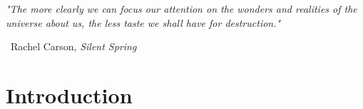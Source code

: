 \documentclass[11pt,a4paper]{report}
\begin{document}


\clearpage
\tableofcontents                     
\listoftables                     
\listoffigures                    
\begin{thesisacknowledgments}        
       
\end{thesisacknowledgments}

\begin{thesisdeclaration}       
 
\end{thesisdeclaration}

\begin{thesisabstract}              
  \begin{singlespace}    
          
 \end{singlespace}
\end{thesisabstract}

\printacronyms[name=Abbreviations]

\renewcommand{\arraystretch}{1.5} %

\setlength{}
\setlength{\epigraphrule}{0pt}

    \vspace*{1cm}
    \epigraph{\protect\singlespace\textit{"The more clearly we can focus our attention on the wonders and realities of the universe about us, the less taste we shall have for destruction."}}{\textemdash \ Rachel Carson, \textit{Silent Spring}}
    
\chapter{Introduction}
    
    
\end{document}
